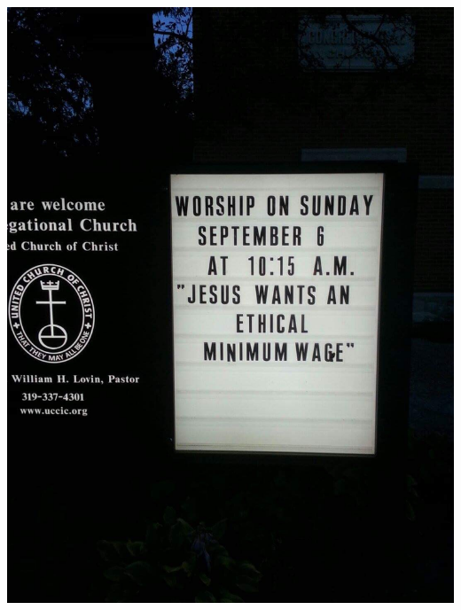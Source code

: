 \documentclass[xcolor=table]{beamer}
\begin{document}
\begin{spacing}{1.2}
\begin{frame}
\centering
\includegraphics[scale=.12]{jesus.jpg} \hspace{5mm}

\end{frame}
\end{spacing}
\end{document}
